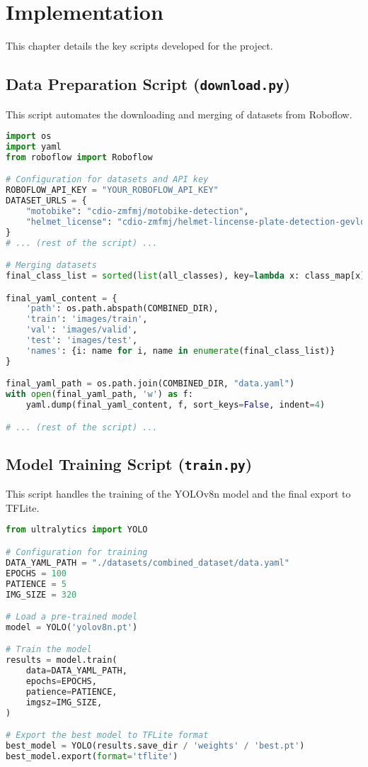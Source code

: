 \chapter{Implementation}
This chapter details the key scripts developed for the project.

\section{Data Preparation Script (\texttt{download.py})}
This script automates the downloading and merging of datasets from Roboflow.
\begin{lstlisting}[language=Python, caption={Key snippet from download.py.}]
import os
import yaml
from roboflow import Roboflow

# Configuration for datasets and API key
ROBOFLOW_API_KEY = "YOUR_ROBOFLOW_API_KEY"
DATASET_URLS = {
    "motobike": "cdio-zmfmj/motobike-detection",
    "helmet_license": "cdio-zmfmj/helmet-lincense-plate-detection-gevlq"
}
# ... (rest of the script) ...

# Merging datasets
final_class_list = sorted(list(all_classes), key=lambda x: class_map[x])

final_yaml_content = {
    'path': os.path.abspath(COMBINED_DIR),
    'train': 'images/train',
    'val': 'images/valid',
    'test': 'images/test',
    'names': {i: name for i, name in enumerate(final_class_list)}
}

final_yaml_path = os.path.join(COMBINED_DIR, "data.yaml")
with open(final_yaml_path, 'w') as f:
    yaml.dump(final_yaml_content, f, sort_keys=False, indent=4)

# ... (rest of the script) ...
\end{lstlisting}

\section{Model Training Script (\texttt{train.py})}
This script handles the training of the YOLOv8n model and the final export to TFLite.
\begin{lstlisting}[language=Python, caption={Key snippet from train.py.}]
from ultralytics import YOLO

# Configuration for training
DATA_YAML_PATH = "./datasets/combined_dataset/data.yaml"
EPOCHS = 100
PATIENCE = 5
IMG_SIZE = 320

# Load a pre-trained model
model = YOLO('yolov8n.pt')

# Train the model
results = model.train(
    data=DATA_YAML_PATH,
    epochs=EPOCHS,
    patience=PATIENCE,
    imgsz=IMG_SIZE,
)

# Export the best model to TFLite format
best_model = YOLO(results.save_dir / 'weights' / 'best.pt')
best_model.export(format='tflite')
\end{lstlisting}

